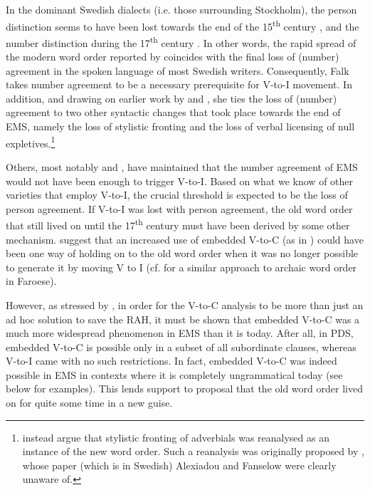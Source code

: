 \documentclass[output=paper]{langscibook}
\begin{document}
In the dominant Swedish dialects (i.e. those surrounding Stockholm), the person distinction seems to have been lost towards the end of the 15\textsuperscript{th} century \citep{Neuman1925}, and the number distinction during the 17\textsuperscript{th} century \citep{Larsson1988}. In other words, the rapid spread of the modern word order reported by \citet{Falk1993} coincides with the final loss of (number) agreement in the spoken language of most Swedish writers. Consequently, Falk takes number agreement to be a necessary prerequisite for V-to-I movement. In addition, and drawing on earlier work by \citet{Platzack1985} and \citet{PlatzackHolmberg1989}, she ties the loss of (number) agreement to two other syntactic changes that took place towards the end of EMS, namely the loss of stylistic fronting and the loss of verbal licensing of null expletives.\footnote{\citet{AlexiadouFanselow2002} instead argue that stylistic fronting of adverbials was reanalysed as an instance of the new word order. Such a reanalysis was originally proposed by \citet{Pettersson1988}, whose paper (which is in Swedish) Alexiadou and Fanselow were clearly unaware of.} 



Others, most notably \citet{Rohrbacher1999} and \citet{KoenemanZeijlstra2014}, have maintained that the number agreement of EMS would not have been enough to trigger V-to-I. Based on what we know of other varieties that employ V-to-I, the crucial threshold is expected to be the loss of person agreement. If V-to-I was lost with person agreement, the old word order that still lived on until the 17\textsuperscript{th} century must have been derived by some other mechanism. \citet{KoenemanZeijlstra2014} suggest that an increased use of embedded V-to-C (as in ) could have been one way of holding on to the old word order when it was no longer possible to generate it by moving V to I (cf. \citealt{HeycockEtAl2010} for a similar approach to archaic word order in Faroese).



However, as stressed by \citet{Gartner2019}, in order for the V-to-C analysis to be more than just an ad hoc solution to save the RAH, it must be shown that embedded V-to-C was a much more widespread phenomenon in EMS than it is today. After all, in PDS, embedded V-to-C is possible only in a subset of all subordinate clauses, whereas V-to-I came with no such restrictions. In fact, embedded V-to-C was indeed possible in EMS in contexts where it is completely ungrammatical today (see  below for examples). This lends support to  proposal that the old word order lived on for quite some time in a new guise.
\end{document}
